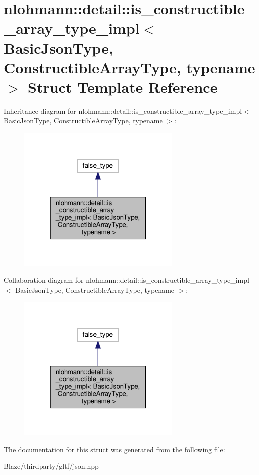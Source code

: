 \hypertarget{structnlohmann_1_1detail_1_1is__constructible__array__type__impl}{}\section{nlohmann\+:\+:detail\+:\+:is\+\_\+constructible\+\_\+array\+\_\+type\+\_\+impl$<$ Basic\+Json\+Type, Constructible\+Array\+Type, typename $>$ Struct Template Reference}
\label{structnlohmann_1_1detail_1_1is__constructible__array__type__impl}


Inheritance diagram for nlohmann\+:\+:detail\+:\+:is\+\_\+constructible\+\_\+array\+\_\+type\+\_\+impl$<$ Basic\+Json\+Type, Constructible\+Array\+Type, typename $>$\+:\nopagebreak
\begin{figure}[H]
\begin{center}
\leavevmode
\includegraphics[width=223pt]{structnlohmann_1_1detail_1_1is__constructible__array__type__impl__inherit__graph}
\end{center}
\end{figure}


Collaboration diagram for nlohmann\+:\+:detail\+:\+:is\+\_\+constructible\+\_\+array\+\_\+type\+\_\+impl$<$ Basic\+Json\+Type, Constructible\+Array\+Type, typename $>$\+:\nopagebreak
\begin{figure}[H]
\begin{center}
\leavevmode
\includegraphics[width=223pt]{structnlohmann_1_1detail_1_1is__constructible__array__type__impl__coll__graph}
\end{center}
\end{figure}


The documentation for this struct was generated from the following file\+:\begin{DoxyCompactItemize}
\item 
Blaze/thirdparty/gltf/json.\+hpp\end{DoxyCompactItemize}
